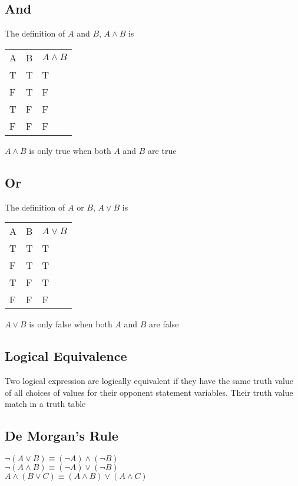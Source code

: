 \documentclass[12pt, letterpaper]{article}
\begin{document}
\subsection{And}
The definition of $A$ and $B$, $A \wedge B$ is 
\begin{center}
\begin{tabular}{|l|l|l|}
    A  &B  &$A \wedge B$ \\
    T  &T  &T \\
    F  &T  &F \\
    T  &F  &F \\
    F  &F  &F \\
\end{tabular}
\end{center}
$A \wedge B$ is only true when both $A$ and $B$ are true 
\subsection{Or}
The definition of $A$ or $B$, $A \vee B$ is 
\begin{center}
\begin{tabular}{|l|l|l|}
    A  &B  &$A \vee B$ \\
    T  &T  &T \\
    F  &T  &T \\
    T  &F  &T \\
    F  &F  &F \\
\end{tabular}
\end{center}
$A \vee B$ is only false when both $A$ and $B$ are false 
\subsection{Logical Equivalence}
Two logical expression are logically equivalent if they have the same truth value of all choices 
of values for their opponent statement variables. Their truth value match in a truth table 
\subsection{De Morgan's Rule}
$\neg(A \vee B) \equiv (\neg A) \wedge (\neg B)$ \\
$\neg(A \wedge B) \equiv (\neg A) \vee (\neg B)$ \\
$A \wedge (B \vee C) \equiv (A \wedge B) \vee (A \wedge C)$
\end{document}
